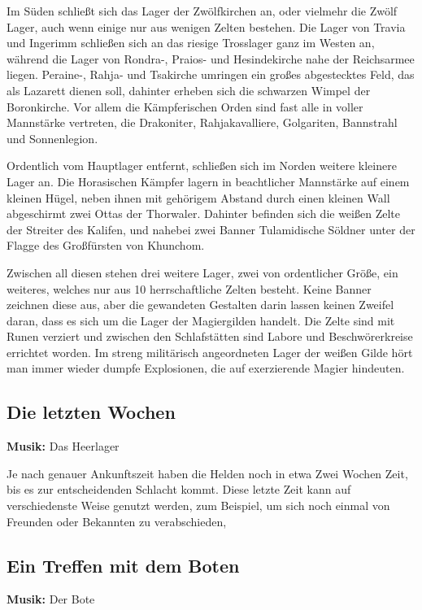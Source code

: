 Im Süden schließt sich das Lager der Zwölfkirchen an, oder vielmehr die Zwölf Lager, auch wenn einige nur aus wenigen Zelten bestehen. Die Lager von Travia und Ingerimm schließen sich an das riesige Trosslager ganz im Westen an, während die Lager von Rondra-, Praios- und Hesindekirche nahe der Reichsarmee liegen. Peraine-, Rahja- und Tsakirche umringen ein großes abgestecktes Feld, das als Lazarett dienen soll, dahinter erheben sich die schwarzen Wimpel der Boronkirche. Vor allem die Kämpferischen Orden sind fast alle in voller Mannstärke vertreten, die Drakoniter, Rahjakavalliere, Golgariten, Bannstrahl und Sonnenlegion.

Ordentlich vom Hauptlager entfernt, schließen sich im Norden weitere kleinere Lager an. Die Horasischen Kämpfer lagern in beachtlicher Mannstärke auf einem kleinen Hügel, neben ihnen mit gehörigem Abstand durch einen kleinen Wall abgeschirmt zwei Ottas der Thorwaler. Dahinter befinden sich die weißen Zelte der Streiter des Kalifen, und nahebei zwei Banner Tulamidische Söldner unter der Flagge des Großfürsten von Khunchom.

Zwischen all diesen stehen drei weitere Lager, zwei von ordentlicher Größe, ein weiteres, welches nur aus 10 herrschaftliche Zelten besteht. Keine Banner zeichnen diese aus, aber die gewandeten Gestalten darin lassen keinen Zweifel daran, dass es sich um die Lager der Magiergilden handelt. Die Zelte sind mit Runen verziert und zwischen den Schlafstätten sind Labore und Beschwörerkreise errichtet worden. Im streng militärisch angeordneten Lager der weißen Gilde hört man immer wieder dumpfe Explosionen, die auf exerzierende Magier hindeuten.

\subsection{Die letzten Wochen}

\textbf{Musik:} Das Heerlager

Je nach genauer Ankunftszeit haben die Helden noch in etwa Zwei Wochen Zeit, bis es zur entscheidenden Schlacht kommt. Diese letzte Zeit kann auf verschiedenste Weise genutzt werden, zum Beispiel, um sich noch einmal von Freunden oder Bekannten zu verabschieden, 


\subsection{Ein Treffen mit dem Boten}

\textbf{Musik:} Der Bote

